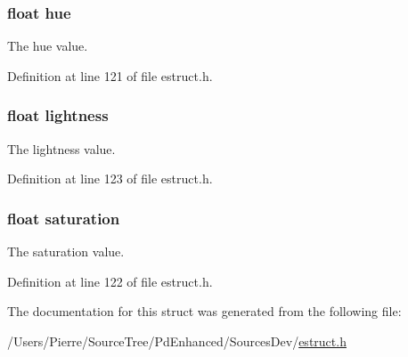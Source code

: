 \hypertarget{struct__hsla_a408d4a7316413ec687c945201a907e98}{
\subsubsection[{hue}]{\setlength{\rightskip}{0pt plus 5cm}float hue}}\label{struct__hsla_a408d4a7316413ec687c945201a907e98}
The hue value. 

Definition at line 121 of file estruct.\-h.

\hypertarget{struct__hsla_a9a22c1947d9e158ae5d791807fae36ed}{
\subsubsection[{lightness}]{\setlength{\rightskip}{0pt plus 5cm}float lightness}}\label{struct__hsla_a9a22c1947d9e158ae5d791807fae36ed}
The lightness value. 

Definition at line 123 of file estruct.\-h.

\hypertarget{struct__hsla_a953351912fb6da22fde59fe0f24909e7}{
\subsubsection[{saturation}]{\setlength{\rightskip}{0pt plus 5cm}float saturation}}\label{struct__hsla_a953351912fb6da22fde59fe0f24909e7}
The saturation value. 

Definition at line 122 of file estruct.\-h.



The documentation for this struct was generated from the following file\-:\begin{DoxyCompactItemize}
\item 
/\-Users/\-Pierre/\-Source\-Tree/\-Pd\-Enhanced/\-Sources\-Dev/\hyperlink{estruct_8h}{estruct.\-h}\end{DoxyCompactItemize}
